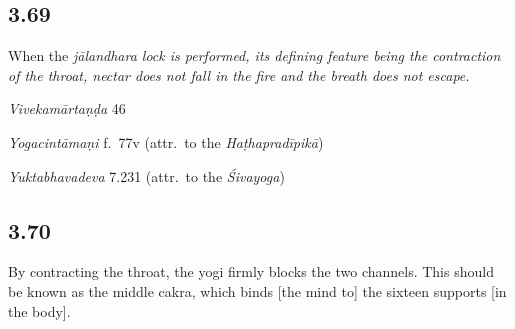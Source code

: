 \begin{ekdosis}


\subsection*{3.69}
\begin{translation}[hp03_069]
When the \sl{jālandhara} lock is performed, its defining feature being the contraction of the throat, nectar does not fall in the fire and the breath does not escape.
\end{translation}

\begin{sources}[hp03_069]
\emph{Vivekamārtaṇḍa} 46
\begin{versinnote}
\tl{\var{pradhāvati ] ; prakupyati AGT}\\!}
\end{versinnote}
\end{sources}

\begin{testimonia}[hp03_069]
\emph{Yogacintāmaṇi} f.~77v (attr.~to the \emph{Haṭhapradīpikā})
\begin{versinnote}
\end{versinnote}

\emph{Yuktabhavadeva} 7.231 (attr.~to the \emph{Śivayoga})
\begin{versinnote}
\end{versinnote}
\end{testimonia}



\subsection*{3.70}
\begin{translation}[hp03_070]
By contracting the throat, the yogi firmly blocks the two channels. This should be known as the middle cakra, which binds [the mind to] the sixteen supports [in the body].
\end{translation}


\end{ekdosis}
